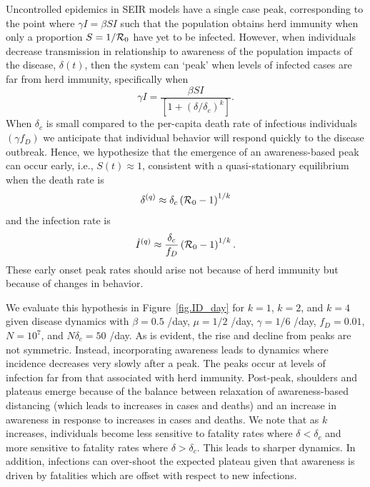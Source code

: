 Uncontrolled epidemics in SEIR models have a single case peak, corresponding 
to the point where $\gamma I = \beta S I $ such that 
the population obtains herd immunity when only a proportion
$S=1/{\cal{R}}_0$ have yet to be infected.
However, when individuals decrease transmission in relationship
to awareness of the population impacts of the disease, $\delta(t)$,
then the system can `peak' when levels of infected cases are
far from herd immunity, specifically when
\begin{equation}
\gamma I = \frac{\beta SI}{\left[1+\left(\delta/\delta_c\right)^{k}\right]}.
\end{equation}
When $\delta_c$ is small compared to the per-capita death rate of infectious individuals $(\gamma f_D)$ we anticipate that individual behavior will respond quickly to the disease outbreak.
Hence, we hypothesize that the
emergence of an
awareness-based peak can occur early, i.e., $S(t)\approx 1$, consistent
with a quasi-stationary equilibrium when the death rate is
\begin{equation}
\delta^{(q)} \approx \delta_c\left({\cal{R}}_0-1\right)^{1/k}
\end{equation}
and the infection rate is
\begin{equation}
\dot{I}^{(q)} \approx \frac{\delta_c}{f_D}\left({\cal{R}}_0-1\right)^{1/k}.
\end{equation}
These early onset peak rates should arise not because
of herd immunity but because of changes in behavior. 

We evaluate this hypothesis in
Figure~\ref{fig.ID_day} for $k=1$, $k=2$, and $k=4$
given disease dynamics with $\beta=0.5$ /day, $\mu=1/2$ /day, $\gamma=1/6$
/day,
$f_D=0.01$, $N=10^7$, and $N\delta_c=50$ /day.  
As is evident, the rise and decline from peaks are not symmetric. Instead,
incorporating
awareness leads to dynamics where incidence decreases very slowly after a peak.
The peaks occur at levels of infection far from that associated
with herd immunity.  
Post-peak, shoulders and plateaus emerge because of the balance
between relaxation of awareness-based
distancing (which leads to increases in cases and deaths) and an 
increase in awareness in response to increases in cases and deaths.  
We note that as $k$ increases, 
individuals become less sensitive to fatality rates
where $\delta < \delta_c$ and more sensitive to fatality rates where $\delta > \delta_c$.  
This leads to sharper dynamics. In addition, 
infections can over-shoot the expected plateau given that awareness
is driven by fatalities which are offset with respect to new infections.

